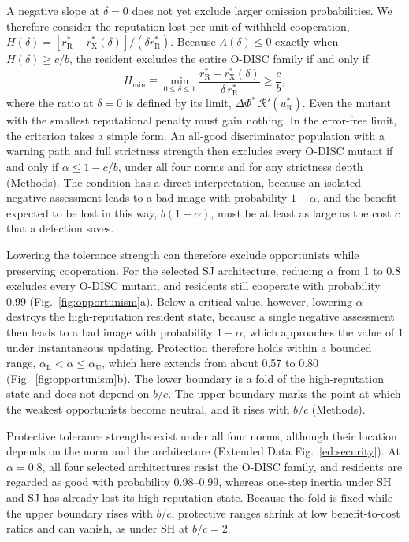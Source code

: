 \documentclass[10pt]{wlscirep}
\newcommand{\Rmap}{\mathscr{R}}            %
\newcommand{\rR}{r_{\mathrm{R}}^{*}}
\newcommand{\uR}{u_{\mathrm{R}}^{*}}
\newcommand{\rX}{r_{\mathrm{X}}^{*}}
\newcommand{\dPhi}{\Delta\Phi^{*}}
\newcommand{\Hmin}{H_{\min}}
\theoremstyle{plain}
\theoremstyle{remark}
\begin{document}
A negative slope at $\delta=0$ does not yet exclude larger omission probabilities. We therefore consider the reputation lost per unit of withheld cooperation, $H(\delta)=[\rR-\rX(\delta)]/(\delta\rR)$. Because $\Lambda(\delta)\leq0$ exactly when $H(\delta)\geq c/b$, the resident excludes the entire O-DISC family if and only if
\begin{equation}
\Hmin\equiv\min_{0\leq\delta\leq1}\frac{\rR-\rX(\delta)}{\delta\,\rR}\geq\frac{c}{b},
\label{eq:security}
\end{equation}
where the ratio at $\delta=0$ is defined by its limit, $\dPhi\,\Rmap'(\uR)$. Even the mutant with the smallest reputational penalty must gain nothing. In the error-free limit, the criterion takes a simple form. An all-good discriminator population with a warning path and full strictness strength then excludes every O-DISC mutant if and only if $\alpha\leq1-c/b$, under all four norms and for any strictness depth (Methods). The condition has a direct interpretation, because an isolated negative assessment leads to a bad image with probability $1-\alpha$, and the benefit expected to be lost in this way, $b(1-\alpha)$, must be at least as large as the cost $c$ that a defection saves.

Lowering the tolerance strength can therefore exclude opportunists while preserving cooperation. For the selected SJ architecture, reducing $\alpha$ from 1 to 0.8 excludes every O-DISC mutant, and residents still cooperate with probability 0.99 (Fig.~\ref{fig:opportunism}a). Below a critical value, however, lowering $\alpha$ destroys the high-reputation resident state, because a single negative assessment then leads to a bad image with probability $1-\alpha$, which approaches the value of 1 under instantaneous updating. Protection therefore holds within a bounded range, $\alpha_{\mathrm L}<\alpha\leq\alpha_{\mathrm U}$, which here extends from about 0.57 to 0.80 (Fig.~\ref{fig:opportunism}b). The lower boundary is a fold of the high-reputation state and does not depend on $b/c$. The upper boundary marks the point at which the weakest opportunists become neutral, and it rises with $b/c$ (Methods).

Protective tolerance strengths exist under all four norms, although their location depends on the norm and the architecture (Extended Data Fig.~\ref{ed:security}). At $\alpha=0.8$, all four selected architectures resist the O-DISC family, and residents are regarded as good with probability 0.98--0.99, whereas one-step inertia under SH and SJ has already lost its high-reputation state. Because the fold is fixed while the upper boundary rises with $b/c$, protective ranges shrink at low benefit-to-cost ratios and can vanish, as under SH at $b/c=2$.
\end{document}
